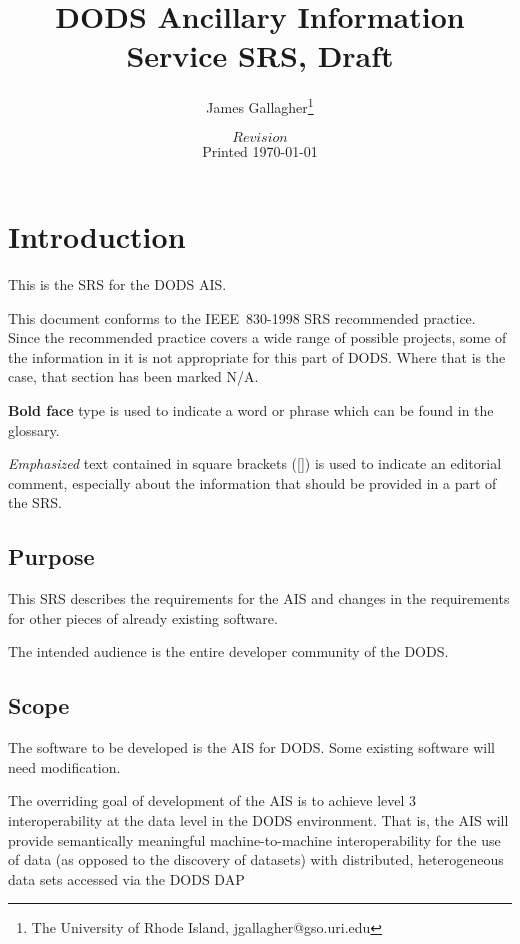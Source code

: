 \documentclass{article}
\begin{document}
\title{DODS Ancillary Information Service SRS, Draft}
\author{James Gallagher\thanks{The University of Rhode Island,
    jgallagher@gso.uri.edu}}
\date{$Revision$ \\ Printed \today}

\maketitle
\tableofcontents

\section{Introduction}
This is the \acl{SRS} for the \acl{DODS} \acl{AIS}. 

This document conforms to the IEEE~830-1998 \ac{SRS} recommended practice.
Since the recommended practice covers a wide range of possible projects, some
of the information in it is not appropriate for this part of \acs{DODS}.
Where that is the case, that section has been marked N/A.

\textbf{Bold face} type is used to indicate a word or phrase which can be
found in the glossary.

\emph{Emphasized} text contained in square brackets ([]) is used to indicate
an editorial comment, especially about the information that should be
provided in a part of the \ac{SRS}.

\subsection{Purpose}
This \ac{SRS} describes the requirements for the \ac{AIS} and changes in the
requirements for other pieces of already existing software.

The intended audience is the entire developer community of the \acl{DODS}.

\subsection{Scope}
\label{sec:scope}

The software to be developed is the \ac{AIS} for \acs{DODS}. Some existing
software will need modification.

The overriding goal of development of the \ac{AIS} is to achieve level 3
interoperability at the data level in the DODS environment. That is, the
\ac{AIS} will provide semantically meaningful machine-to-machine
interoperability for the use of data (as opposed to the discovery of
datasets) with distributed, heterogeneous data sets accessed via the DODS DAP
\end{document}

